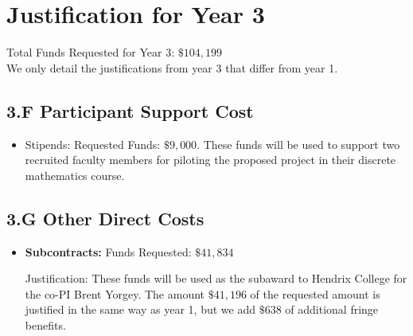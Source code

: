 \documentclass[11pt]{article}
\begin{document}

\section{Justification for Year 3}
\label{sec:justification_for_year_3}

Total Funds Requested for Year 3: $\$104,199$\\

\noindent
We only detail the justifications from year 3 that differ from year 1.

\subsection*{3.F Participant Support Cost }
\label{subsec:3.f_participant_support_cost_}
\begin{itemize}
\item Stipends: Requested Funds: $\$9,000$.  These funds will be used
  to support two recruited faculty members for piloting the proposed
  project in their discrete mathematics course.
\end{itemize}

\subsection*{3.G Other Direct Costs}
\label{subsec:other}

\begin{itemize}
\item \textbf{Subcontracts:} Funds Requested: $\$41,834$

  Justification: These funds will be used as the subaward to Hendrix
  College for the co-PI Brent Yorgey.  The amount $\$41,196$ of the
  requested amount is justified in the same way as year 1, but we add
  $\$638$ of additional fringe benefits.
\end{itemize}

\end{document}
